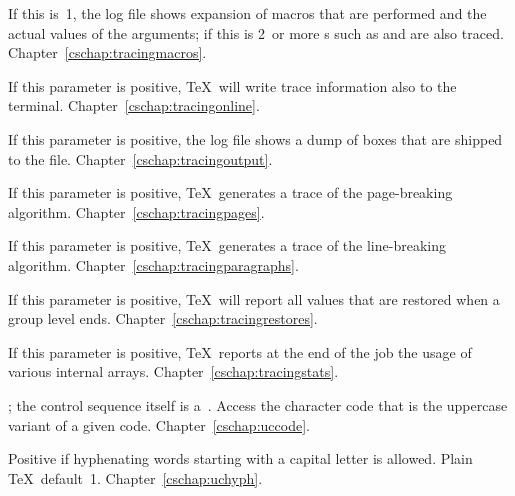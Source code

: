 \begin{glossinventory}
\item [\cs{tracingmacros}]
      If this is~1, the log file shows expansion of macros 
      that are performed and the actual values of the arguments; 
      if this is 2~or more
      s such as 
       and  are also traced.
Chapter~\ref{cschap:tracingmacros}.

\item [\cs{tracingonline}]
      If this parameter is positive, \TeX\ will write trace      
      information also to the terminal.
Chapter~\ref{cschap:tracingonline}.

\item [\cs{tracingoutput}]
      If this parameter is positive, the log file shows a dump of boxes 
      that are shipped to the  file.
Chapter~\ref{cschap:tracingoutput}.

\item [\cs{tracingpages}]
      If this parameter is positive, \TeX\ generates      
      a trace of the page-breaking algorithm.
Chapter~\ref{cschap:tracingpages}.

\item [\cs{tracingparagraphs}]
      If this parameter is positive, \TeX\ generates      
      a trace of the line-breaking algorithm.
Chapter~\ref{cschap:tracingparagraphs}.

\item [\cs{tracingrestores}]
      If this parameter is positive, \TeX\ will report      
      all values that are restored when a group level ends.
Chapter~\ref{cschap:tracingrestores}.

\item [\cs{tracingstats}]
      If this parameter is positive, \TeX\ reports at the      
      end of the job the usage of various internal arrays.
Chapter~\ref{cschap:tracingstats}.

\item [\cs{uccode\gr{8-bit number}}]
      ; the control sequence itself
      is a~.
      Access
      the character code that is the uppercase variant of a given code.
Chapter~\ref{cschap:uccode}.

\item [\cs{uchyph}]
      Positive if hyphenating words starting with a capital 
      letter is allowed. 
      Plain \TeX\ default~1.
Chapter~\ref{cschap:uchyph}.


\end{glossinventory}
